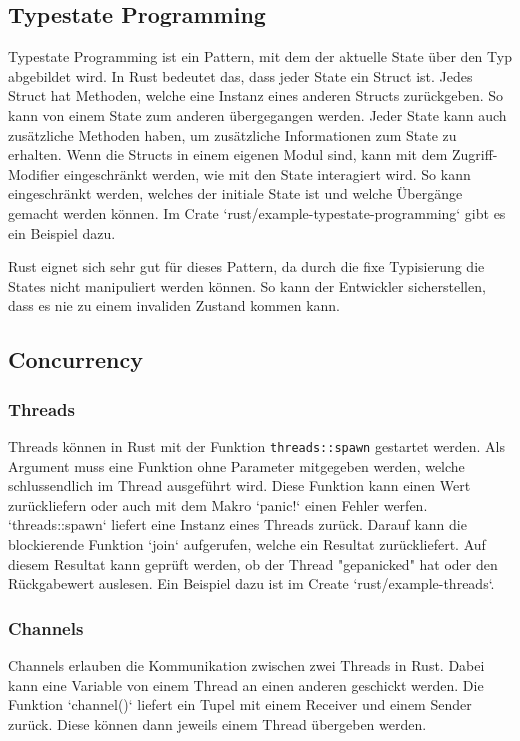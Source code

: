 \documentclass[letterpaper,12pt]{article}
\begin{document}
    \subsection{Typestate Programming}\label{subsec:typestate-programming)}
    Typestate Programming ist ein Pattern, mit dem der aktuelle State über den Typ abgebildet wird.
    In Rust bedeutet das, dass jeder State ein Struct ist.
    Jedes Struct hat Methoden, welche eine Instanz eines anderen Structs zurückgeben.
    So kann von einem State zum anderen übergegangen werden.
    Jeder State kann auch zusätzliche Methoden haben, um zusätzliche Informationen zum State zu erhalten.
    Wenn die Structs in einem eigenen Modul sind, kann mit dem Zugriff-Modifier eingeschränkt werden, wie mit den State interagiert wird.
    So kann eingeschränkt werden, welches der initiale State ist und welche Übergänge gemacht werden können.
    Im Crate `rust/example-typestate-programming` gibt es ein Beispiel dazu.

    Rust eignet sich sehr gut für dieses Pattern, da durch die fixe Typisierung die States nicht manipuliert werden können.
    So kann der Entwickler sicherstellen, dass es nie zu einem invaliden Zustand kommen kann.

    \subsection{Concurrency}\label{subsec:concurrency}
    \subsubsection{Threads}\label{subsubsec:threads}
    Threads können in Rust mit der Funktion \texttt{threads::spawn} gestartet werden.
    Als Argument muss eine Funktion ohne Parameter mitgegeben werden, welche schlussendlich im Thread ausgeführt wird.
    Diese Funktion kann einen Wert zurückliefern oder auch mit dem Makro `panic!` einen Fehler werfen.
    `threads::spawn` liefert eine Instanz eines Threads zurück.
    Darauf kann die blockierende Funktion `join` aufgerufen, welche ein Resultat zurückliefert.
    Auf diesem Resultat kann geprüft werden, ob der Thread "gepanicked" hat oder den Rückgabewert auslesen.
    Ein Beispiel dazu ist im Create `rust/example-threads`.

    \subsubsection{Channels}\label{subsubsec:channels}
    Channels erlauben die Kommunikation zwischen zwei Threads in Rust.
    Dabei kann eine Variable von einem Thread an einen anderen geschickt werden.
    Die Funktion `channel()` liefert ein Tupel mit einem Receiver und einem Sender zurück.
    Diese können dann jeweils einem Thread übergeben werden.
\end{document}
